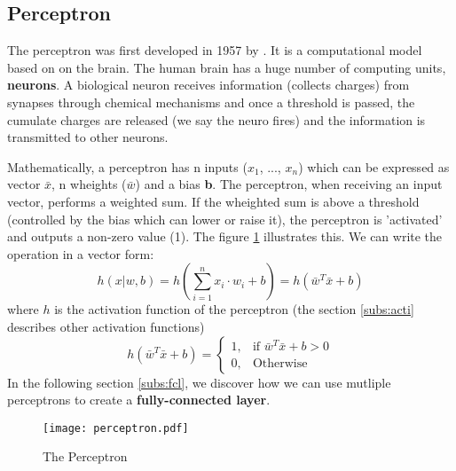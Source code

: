 \subsection{Perceptron} \label{subs:perceptron}
The perceptron was first developed in 1957 by \textcite{brain_perceptron_nodate}. It is a computational model based on on the brain. The human brain has a huge number of computing units, \textbf{neurons}. A biological neuron receives information (collects charges) from synapses through chemical mechanisms and once a threshold is passed, the cumulate charges are released (we say the neuro fires) and the information is transmitted to other neurons.

Mathematically, a perceptron has n inputs ($x_1$, ..., $x_n$) which can be expressed as vector \textbf{$\bar{x}$}, n wheights (\textbf{$\bar{w}$}) and a bias \textbf{b}. The perceptron, when receiving an input vector, performs a weighted sum. If the wheighted sum is above a threshold (controlled by the bias which can lower or raise it), the perceptron is 'activated' and outputs a non-zero value (1). The figure \ref{fig:perceptron} illustrates this. We can write the operation in a vector form:
%
$$
h(x| w, b) = h(\sum^{n}_{i=1} x_i \cdot w_i + b) = h ( \textbf{$\bar{w}$}^{T} \textbf{$\bar{x}$} + b)
$$
%
where $h$ is the activation function of the perceptron (the section \ref{subs:acti} describes other activation functions)
$$
h ( \textbf{$\bar{w}$}^{T} \textbf{$\bar{x}$} + b) = \begin{cases} 1, & \mbox{if } \textbf{$\bar{w}$}^{T} \textbf{$\bar{x}$} + b > 0 \\ 0, & \mbox{Otherwise} \end{cases}
$$
In the following section \ref{subs:fcl}, we discover how we can use mutliple perceptrons to create a \textbf{fully-connected layer}.
%
\begin{figure}
    \centering
    \texttt{[image: perceptron.pdf]}
    \caption{The Perceptron}
    \label{fig:perceptron}
\end{figure}
